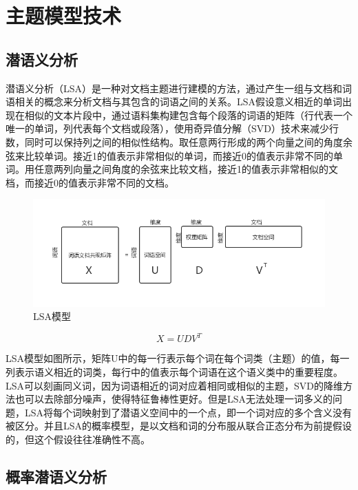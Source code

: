 \documentclass[winfonts,master,oneside,nobackinfo]{njuthesis}
\begin{document}
\section{主题模型技术}

\subsection{潜语义分析}

潜语义分析（LSA）是一种对文档主题进行建模的方法，通过产生一组与文档和词语相关的概念来分析文档与其包含的词语之间的关系。LSA假设意义相近的单词出现在相似的文本片段中，通过语料集构建包含每个段落的词语的矩阵（行代表一个唯一的单词，列代表每个文档或段落），使用奇异值分解（SVD）技术来减少行数，同时可以保持列之间的相似性结构。取任意两行形成的两个向量之间的角度余弦来比较单词。接近1的值表示非常相似的单词，而接近0的值表示非常不同的单词。用任意两列向量之间角度的余弦来比较文档，接近1的值表示非常相似的文档，而接近0的值表示非常不同的文档。

\begin{figure}[ht]
\centering
\begin{minipage}[t]{\textwidth}
\centering
\includegraphics[width=1\textwidth]{./figure/LSA.jpg}
\caption{LSA模型}
\label{lab:1}
\end{minipage}
\end{figure}

$$X = U D V ^ { T }$$

LSA模型如图所示，矩阵U中的每一行表示每个词在每个词类（主题）的值，每一列表示语义相近的词类，每行中的值表示每个词语在这个语义类中的重要程度。LSA可以刻画同义词，因为词语相近的词对应着相同或相似的主题，SVD的降维方法也可以去除部分噪声，使得特征鲁棒性更好。但是LSA无法处理一词多义的问题，LSA将每个词映射到了潜语义空间中的一个点，即一个词对应的多个含义没有被区分。并且LSA的概率模型，是以文档和词的分布服从联合正态分布为前提假设的，但这个假设往往准确性不高。

\subsection{概率潜语义分析}
\end{document}

